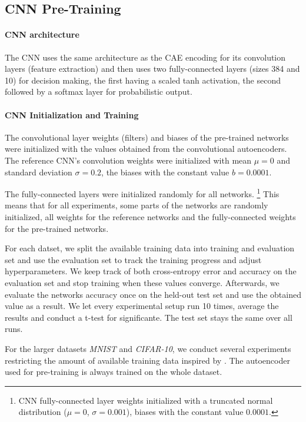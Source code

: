\documentclass{article}
\begin{document}
  \subsection{CNN Pre-Training}

    \paragraph{CNN architecture} The CNN uses the same architecture as the CAE encoding for its convolution layers (feature extraction) and then uses two fully-connected layers (sizes 384 and 10) for decision making, the first having a scaled tanh activation, the second followed by a softmax layer for probabilistic output.

    \paragraph{CNN Initialization and Training}

    The convolutional layer weights (filters) and biases of the pre-trained networks were initialized with the values obtained from the convolutional autoencoders. The reference CNN's convolution weights were initialized with mean $\mu = 0 $ and standard deviation $\sigma = 0.2$, the biases with the constant value $b =  0.0001$.

    The fully-connected layers were initialized randomly for all networks. \footnote{CNN fully-connected layer weights initialized with a truncated normal distribution ($\mu = 0$, $\sigma = 0.001$), biases with the constant value $0.0001$.}
    This means that for all experiments, some parts of the networks are randomly initialized, all weights for the reference networks and the fully-connected weights for the pre-trained networks. 

    For each datset, we split the available training data into training and evaluation set and use the evaluation set to track the training progress and adjust hyperparameters. We keep track of both cross-entropy error and accuracy on the evaluation set and stop training when these values converge. Afterwards, we evaluate the networks accuracy once on the held-out test set and use the obtained value as a result. We let every experimental setup run 10 times, average the results and conduct a t-test for significante. The test set stays the same over all runs. 
 
    For the larger datasets \emph{MNIST} and \emph{CIFAR-10}, we conduct several experiments restricting the amount of available training data inspired by \citep{masci11}. The autoencoder used for pre-training is always trained on the whole dataset. 
\end{document}
